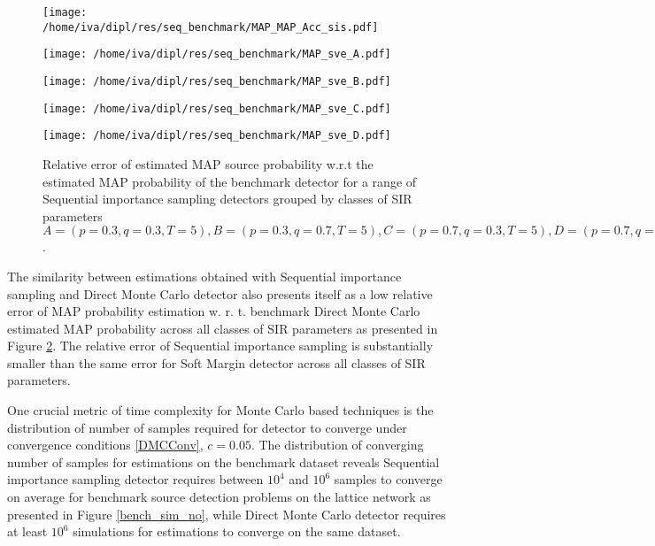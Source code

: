 \documentclass[times, utf8, diplomski]{fer}
\begin{document}
\begin{figure}[H]
\begin{minipage}{\linewidth}
\center
\texttt{[image: /home/iva/dipl/res/seq\_benchmark/MAP\_MAP\_Acc\_sis.pdf]}
\label{map_map_acc_sis}
\end{minipage}
\end{figure}
\begin{figure}[H]
\begin{minipage}{0.5\textwidth}
\center
\texttt{[image: /home/iva/dipl/res/seq\_benchmark/MAP\_sve\_A.pdf]}
\end{minipage}
\begin{minipage}{0.5\textwidth}
\center
\texttt{[image: /home/iva/dipl/res/seq\_benchmark/MAP\_sve\_B.pdf]}
\end{minipage}
\begin{minipage}{0.5\textwidth}
\center
\texttt{[image: /home/iva/dipl/res/seq\_benchmark/MAP\_sve\_C.pdf]}
\end{minipage}
\begin{minipage}{0.5\textwidth}
\center
\texttt{[image: /home/iva/dipl/res/seq\_benchmark/MAP\_sve\_D.pdf]}
\end{minipage}
\caption{Relative error of estimated MAP source probability w.r.t the estimated MAP probability of the benchmark detector for a range of Sequential importance sampling detectors grouped by classes of SIR parameters  $A = (p=0.3, q=0.3, T=5), B = (p=0.3, q=0.7, T=5), C = (p=0.7, q=0.3, T=5), D = (p=0.7, q=0.7, T=5)$.}
\label{rel_err}
\end{figure}

The similarity between estimations obtained with Sequential importance sampling and Direct Monte Carlo detector also presents itself as a low relative error of MAP probability estimation w. r. t. benchmark Direct Monte Carlo estimated MAP probability across all classes of SIR parameters as presented in Figure \ref{rel_err}. The relative error of Sequential importance sampling is substantially smaller than the same error for Soft Margin detector across all classes of SIR parameters.


One crucial metric of time complexity for Monte Carlo based techniques is the distribution of number of samples required for detector to converge under convergence conditions \ref{DMCConv}, $c=0.05$.  The distribution of converging number of samples for estimations on the benchmark dataset reveals Sequential importance sampling detector requires between $10^4$ and $10^6$ samples to converge on average for  benchmark source detection problems on the lattice network as presented in Figure \ref{bench_sim_no}, while Direct Monte Carlo detector requires at least $10^6$ simulations for estimations to converge on the same dataset. 
\end{document}
